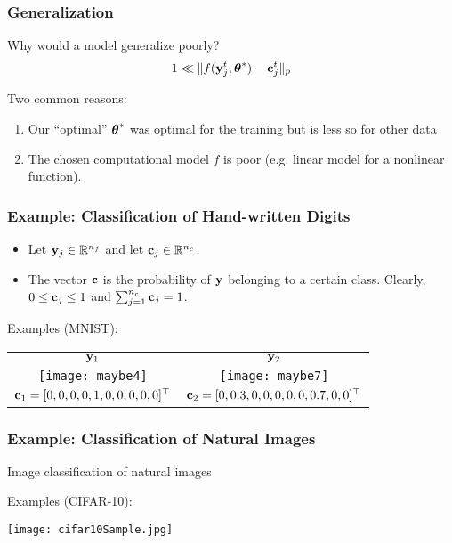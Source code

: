 \documentclass[12pt,fleqn]{beamer}
\begin{document}
\begin{frame}\frametitle{Generalization}


Why would a model generalize poorly?
$$ 1 \ll \|f({\bf y}^t_j,{\boldsymbol \theta}^*) - {\bf c}_j^t\|_p $$

\bigskip
\pause

Two common reasons:
\begin{enumerate}
\item Our ``optimal'' ${\boldsymbol \theta}^*$ was optimal for the training but is less so for other data
\item The chosen computational model $f$ is poor (e.g. linear model for a nonlinear function).
\end{enumerate}


\end{frame} 
\begin{frame}\frametitle{Example: Classification of Hand-written Digits }

\begin{itemize}
\item
Let ${\bf y}_j \in \mathbb{R}^{n_f}$ and let ${\bf c}_j\in \mathbb{R}^{n_c}$.
\item
The vector ${\bf c}$ is the probability of ${\bf y}$ belonging to a certain class. Clearly, $0\le {\bf c}_j \le 1$ and $\sum_{j=1}^{n_c} {\bf c}_j = 1$.
\end{itemize}

\vfill

Examples (MNIST):
\begin{center}
	\begin{tabular}{cc}
		${\bf y}_1$ & ${\bf y}_2$\\
	\texttt{[image: maybe4]} &
	\texttt{[image: maybe7]} \\
	${\bf c}_1 = [0, 0, 0, 0, 1, 0, 0, 0, 0, 0]^\top$ &
	${\bf c}_2 = [0, 0.3, 0, 0, 0, 0, 0, 0.7, 0, 0]^\top$
	\end{tabular}
	
\end{center}


\end{frame} 
\begin{frame}\frametitle{Example: Classification of Natural Images}

Image classification of natural images
\bigskip

Examples (CIFAR-10):
\begin{center}
\texttt{[image: cifar10Sample.jpg]} 
\end{center}

\end{frame}
 
\end{document}

